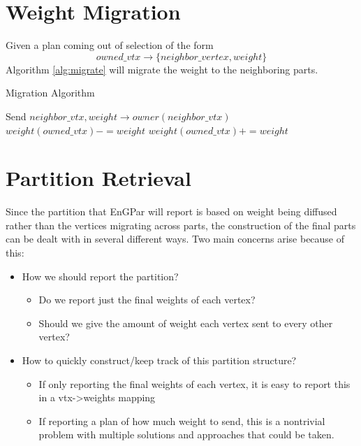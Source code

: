 \documentclass[a4paper]{article}
\begin{document}
{  \section{Weight Migration}
  \label{sec:migrate}

  Given a plan coming out of selection of the form
  $$owned\_vtx \rightarrow \{neighbor\_vertex, weight\}$$
  Algorithm \ref{alg:migrate} will migrate the weight to the neighboring parts.

  \begin{algorithm}
    \caption{Migration Algorithm}
    \label{alg:migrate}
    \small
    \begin{algorithmic}[1]
      \State Send ${neighbor\_vtx,weight} \rightarrow owner(neighbor\_vtx)$
      \State $weight(owned\_vtx) -= weight$
      \EndFor
      \State $weight(owned\_vtx) += weight$
      \EndFor
      \EndProcedure
    \end{algorithmic}
  \end{algorithm}

  \section{Partition Retrieval}
  Since the partition that EnGPar will report is based on weight being diffused rather than the vertices migrating across parts, the construction of the final parts can be dealt with in several different ways. Two main concerns arise because of this:
  \begin{itemize}
  \item How we should report the partition?
    \begin{itemize}
    \item Do we report just the final weights of each vertex?
    \item Should we give the amount of weight each vertex sent to every other vertex?
    \end{itemize}
  \item How to quickly construct/keep track of this partition structure?
    \begin{itemize}
    \item If only reporting the final weights of each vertex, it is easy to report this in a vtx->weights mapping
    \item If reporting a plan of how much weight to send, this is a nontrivial problem with multiple solutions and approaches that could be taken.
    \end{itemize}
  \end{itemize}
  {
  \color{blue}
}}
\end{document}

